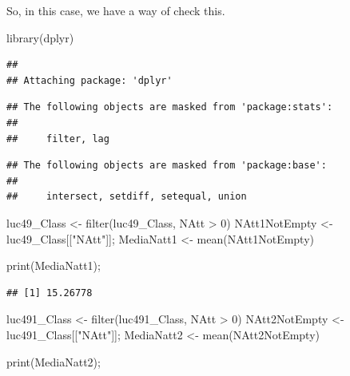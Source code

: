 \documentclass[
]{article}
\newenvironment{Shaded}{\begin{snugshade}}{\end{snugshade}}
\newcommand{\DecValTok}[1]{\textcolor[rgb]{0.00,0.00,0.81}{#1}}
\newcommand{\FunctionTok}[1]{\textcolor[rgb]{0.00,0.00,0.00}{#1}}
\newcommand{\NormalTok}[1]{#1}
\newcommand{\OtherTok}[1]{\textcolor[rgb]{0.56,0.35,0.01}{#1}}
\newcommand{\SpecialCharTok}[1]{\textcolor[rgb]{0.00,0.00,0.00}{#1}}
\newcommand{\StringTok}[1]{\textcolor[rgb]{0.31,0.60,0.02}{#1}}
\begin{document}
So, in this case, we have a way of check this.

\begin{Shaded}
\begin{Highlighting}[]
 \FunctionTok{library}\NormalTok{(dplyr)}
\end{Highlighting}
\end{Shaded}

\begin{verbatim}
## 
## Attaching package: 'dplyr'
\end{verbatim}

\begin{verbatim}
## The following objects are masked from 'package:stats':
## 
##     filter, lag
\end{verbatim}

\begin{verbatim}
## The following objects are masked from 'package:base':
## 
##     intersect, setdiff, setequal, union
\end{verbatim}

\begin{Shaded}
\begin{Highlighting}[]
\NormalTok{ luc49\_Class }\OtherTok{\textless{}{-}} \FunctionTok{filter}\NormalTok{(luc49\_Class, NAtt }\SpecialCharTok{\textgreater{}} \DecValTok{0}\NormalTok{)}
\NormalTok{ NAtt1NotEmpty }\OtherTok{\textless{}{-}}\NormalTok{ luc49\_Class[[}\StringTok{"NAtt"}\NormalTok{]];}
\NormalTok{ MediaNatt1 }\OtherTok{\textless{}{-}} \FunctionTok{mean}\NormalTok{(NAtt1NotEmpty)}

 \FunctionTok{print}\NormalTok{(MediaNatt1);}
\end{Highlighting}
\end{Shaded}

\begin{verbatim}
## [1] 15.26778
\end{verbatim}

\begin{Shaded}
\begin{Highlighting}[]
\NormalTok{ luc491\_Class }\OtherTok{\textless{}{-}} \FunctionTok{filter}\NormalTok{(luc491\_Class, NAtt }\SpecialCharTok{\textgreater{}} \DecValTok{0}\NormalTok{)}
\NormalTok{ NAtt2NotEmpty }\OtherTok{\textless{}{-}}\NormalTok{ luc491\_Class[[}\StringTok{"NAtt"}\NormalTok{]];}
\NormalTok{ MediaNatt2 }\OtherTok{\textless{}{-}} \FunctionTok{mean}\NormalTok{(NAtt2NotEmpty)}

 \FunctionTok{print}\NormalTok{(MediaNatt2);}
\end{Highlighting}
\end{Shaded}
\end{document}
